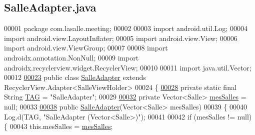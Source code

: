 \hypertarget{_salle_adapter_8java_source}{}\subsection{Salle\+Adapter.\+java}
\label{_salle_adapter_8java_source}

\begin{DoxyCode}
00001 \textcolor{keyword}{package }com.lasalle.meeting;
00002 
00003 \textcolor{keyword}{import} android.util.Log;
00004 \textcolor{keyword}{import} android.view.LayoutInflater;
00005 \textcolor{keyword}{import} android.view.View;
00006 \textcolor{keyword}{import} android.view.ViewGroup;
00007 
00008 \textcolor{keyword}{import} androidx.annotation.NonNull;
00009 \textcolor{keyword}{import} androidx.recyclerview.widget.RecyclerView;
00010 
00011 \textcolor{keyword}{import} java.util.Vector;
00012 
\hyperlink{classcom_1_1lasalle_1_1meeting_1_1_salle_adapter}{00023} \textcolor{keyword}{public} \textcolor{keyword}{class }\hyperlink{classcom_1_1lasalle_1_1meeting_1_1_salle_adapter}{SalleAdapter} \textcolor{keyword}{extends} RecyclerView.Adapter<SalleViewHolder>
00024 \{
\hyperlink{classcom_1_1lasalle_1_1meeting_1_1_salle_adapter_a774947591a1beedaffd58989783206b1}{00028}     \textcolor{keyword}{private} \textcolor{keyword}{static} \textcolor{keyword}{final} String \hyperlink{classcom_1_1lasalle_1_1meeting_1_1_salle_adapter_a774947591a1beedaffd58989783206b1}{TAG} = \textcolor{stringliteral}{"SalleAdapter"};           
00029 
\hyperlink{classcom_1_1lasalle_1_1meeting_1_1_salle_adapter_a3988ff211fbf3052b553d77ba0711a5a}{00032}     \textcolor{keyword}{private} Vector<Salle> \hyperlink{classcom_1_1lasalle_1_1meeting_1_1_salle_adapter_a3988ff211fbf3052b553d77ba0711a5a}{mesSalles} = null;                     
00033 
\hyperlink{classcom_1_1lasalle_1_1meeting_1_1_salle_adapter_aac5caf27dc7448e1f37868066b3c9d00}{00038}     \textcolor{keyword}{public} \hyperlink{classcom_1_1lasalle_1_1meeting_1_1_salle_adapter_aac5caf27dc7448e1f37868066b3c9d00}{SalleAdapter}(Vector<Salle> mesSalles)
00039     \{
00040         Log.d(TAG, \textcolor{stringliteral}{"SalleAdapter (Vector<Salle>)"});
00041 
00042         \textcolor{keywordflow}{if} (mesSalles != null) \{
00043             this.mesSalles = \hyperlink{classcom_1_1lasalle_1_1meeting_1_1_salle_adapter_a3988ff211fbf3052b553d77ba0711a5a}{mesSalles};

\end{DoxyCode}
